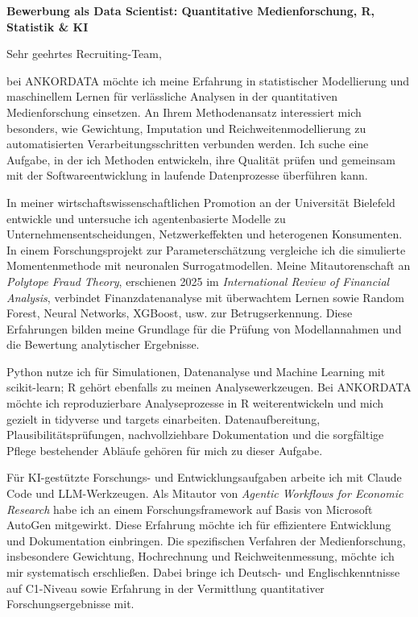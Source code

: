 \documentclass[11pt]{article}
\begin{document}
\vspace{0.05cm}

\noindent
\textbf{Bewerbung als Data Scientist: Quantitative Medienforschung, R, Statistik \& KI}

\noindent Sehr geehrtes Recruiting-Team,

bei ANKORDATA möchte ich meine Erfahrung in statistischer Modellierung und maschinellem Lernen für verlässliche Analysen in der quantitativen Medienforschung einsetzen. 
An Ihrem Methodenansatz interessiert mich besonders, wie Gewichtung, Imputation und Reichweitenmodellierung zu automatisierten Verarbeitungsschritten verbunden werden. 
Ich suche eine Aufgabe, in der ich Methoden entwickeln, ihre Qualität prüfen und gemeinsam mit der Softwareentwicklung in laufende Datenprozesse überführen kann.

In meiner wirtschaftswissenschaftlichen Promotion an der Universität Bielefeld entwickle und untersuche ich agentenbasierte Modelle zu Unternehmensentscheidungen, 
Netzwerkeffekten und heterogenen Konsumenten. 
In einem Forschungsprojekt zur Parameterschätzung vergleiche ich die simulierte Momentenmethode mit neuronalen Surrogatmodellen. 
Meine Mitautorenschaft an \emph{Polytope Fraud Theory}, 
erschienen 2025 im \emph{International Review of Financial Analysis}, 
verbindet Finanzdatenanalyse mit überwachtem Lernen sowie Random Forest, Neural Networks, XGBoost, usw. zur Betrugserkennung. 
Diese Erfahrungen bilden meine Grundlage für die Prüfung von Modellannahmen und die Bewertung analytischer Ergebnisse.

Python nutze ich für Simulationen, Datenanalyse und Machine Learning mit scikit-learn; 
R gehört ebenfalls zu meinen Analysewerkzeugen. 
Bei ANKORDATA möchte ich reproduzierbare Analyseprozesse in R weiterentwickeln und mich gezielt in tidyverse und targets einarbeiten. 
Datenaufbereitung, Plausibilitätsprüfungen, nachvollziehbare Dokumentation und die sorgfältige Pflege bestehender Abläufe gehören für mich zu dieser Aufgabe.

Für KI-gestützte Forschungs- und Entwicklungsaufgaben arbeite ich mit Claude Code und LLM-Werkzeugen. Als Mitautor von \emph{Agentic Workflows for Economic Research} habe ich an einem Forschungsframework auf Basis von Microsoft AutoGen mitgewirkt. 
Diese Erfahrung möchte ich für effizientere Entwicklung und Dokumentation einbringen. 
Die spezifischen Verfahren der Medienforschung, insbesondere Gewichtung, Hochrechnung und Reichweitenmessung, möchte ich mir systematisch erschließen. 
Dabei bringe ich Deutsch- und Englischkenntnisse auf C1-Niveau sowie Erfahrung in der Vermittlung quantitativer Forschungsergebnisse mit.
\end{document}
